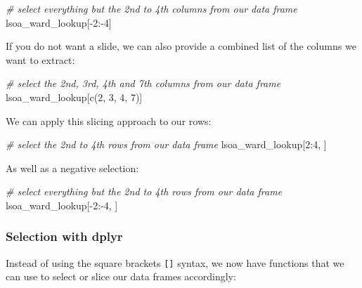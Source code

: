 \documentclass[
]{book}
\newenvironment{Shaded}{\begin{snugshade}}{\end{snugshade}}
\newcommand{\CommentTok}[1]{\textcolor[rgb]{0.56,0.35,0.01}{\textit{#1}}}
\newcommand{\DecValTok}[1]{\textcolor[rgb]{0.00,0.00,0.81}{#1}}
\newcommand{\FunctionTok}[1]{\textcolor[rgb]{0.00,0.00,0.00}{#1}}
\newcommand{\NormalTok}[1]{#1}
\newcommand{\SpecialCharTok}[1]{\textcolor[rgb]{0.00,0.00,0.00}{#1}}
\begin{document}
\begin{Shaded}
\begin{Highlighting}[]
\CommentTok{\# select everything but the 2nd to 4th columns from our data frame}
\NormalTok{lsoa\_ward\_lookup[}\SpecialCharTok{{-}}\DecValTok{2}\SpecialCharTok{:{-}}\DecValTok{4}\NormalTok{]}
\end{Highlighting}
\end{Shaded}

If you do not want a slide, we can also provide a combined list of the columns we want to extract:

\begin{Shaded}
\begin{Highlighting}[]
\CommentTok{\# select the 2nd, 3rd, 4th and 7th columns from our data frame}
\NormalTok{lsoa\_ward\_lookup[}\FunctionTok{c}\NormalTok{(}\DecValTok{2}\NormalTok{, }\DecValTok{3}\NormalTok{, }\DecValTok{4}\NormalTok{, }\DecValTok{7}\NormalTok{)]}
\end{Highlighting}
\end{Shaded}

We can apply this slicing approach to our rows:

\begin{Shaded}
\begin{Highlighting}[]
\CommentTok{\# select the 2nd to 4th rows from our data frame}
\NormalTok{lsoa\_ward\_lookup[}\DecValTok{2}\SpecialCharTok{:}\DecValTok{4}\NormalTok{, ]}
\end{Highlighting}
\end{Shaded}

As well as a negative selection:

\begin{Shaded}
\begin{Highlighting}[]
\CommentTok{\# select everything but the 2nd to 4th rows from our data frame}
\NormalTok{lsoa\_ward\_lookup[}\SpecialCharTok{{-}}\DecValTok{2}\SpecialCharTok{:{-}}\DecValTok{4}\NormalTok{, ]}
\end{Highlighting}
\end{Shaded}

\hypertarget{selection-with-dplyr}{%
\subsubsection{Selection with dplyr}\label{selection-with-dplyr}}

Instead of using the square brackets \texttt{{[}{]}} syntax, we now have functions that we can use to select or slice our data frames accordingly:
\end{document}

